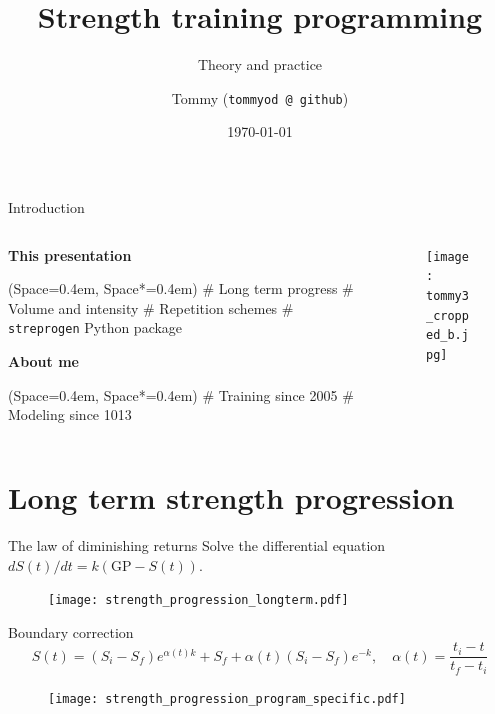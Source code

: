 \documentclass[11pt, aspectratio=149]{beamer}
\title{Strength training programming}
\subtitle{Theory and practice}
\date{\today}
\author{Tommy (\texttt{tommyod @ github})}
\newcommand{\listSpace}{0.4em}
\theoremstyle{plain}
\begin{document}
\maketitle

\begin{frame}[fragile, t]{Introduction}
\begin{columns}
\begin{column}{0.6\textwidth}
\textbf{This presentation}
\begin{easylist}[itemize]
	\ListProperties(Space=\listSpace, Space*=\listSpace)
	# Long term progress
	# Volume and intensity
	# Repetition schemes
	# \texttt{streprogen} Python package
\end{easylist}
\vspace*{2em}
\textbf{About me}
\begin{easylist}[itemize]
	\ListProperties(Space=\listSpace, Space*=\listSpace)
	# Training since 2005
	# Modeling since 1013
\end{easylist}
\end{column}
\begin{column}{0.4\textwidth}
	\begin{figure}
	\centering
	\texttt{[image: tommy3\_cropped\_b.jpg]}
\end{figure}
\end{column}
\end{columns}
\end{frame}

\section{Long term strength progression}

\begin{frame}[fragile, t]{The law of diminishing returns}
	\vfill
	Solve the differential equation $d S(t) / dt = k \left ( \text{GP} - S(t) \right )$.
	\vfill
	\begin{figure}
		\centering
		\texttt{[image: strength\_progression\_longterm.pdf]}
	\end{figure}
	\vfill
\end{frame}

\begin{frame}[fragile, t]{Boundary correction}
	\vfill
	\begin{equation*}
		S( t) = (S_{i}-S_{f})e^{\alpha(t)k} + S_{f} + \alpha(t) (S_{i}-S_{f})e^{-k}, \quad \alpha(t) = \frac{ t_{i}-t }{t_{f}-t_{i}}
	\end{equation*}
	\vfill
	\begin{figure}
		\centering
		\texttt{[image: strength\_progression\_program\_specific.pdf]}
	\end{figure}
	\vfill
\end{frame}
\end{document}
